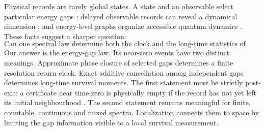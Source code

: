 \documentclass[10pt]{article}
\theoremstyle{definition}
\begin{document}
Physical records are rarely global states. A state and an observable select
particular energy gaps \cite{GarciaPintosEtAl2017}; delayed observable
records can reveal a dynamical dimension \cite{WolfPerezGarcia2009}; and
energy-level graphs organize accessible quantum dynamics
\cite{Altafini2002}. These facts suggest a sharper question:
\begin{equation}
 \boxed{\text{Can one spectral law determine both the clock and the
 long-time statistics of quantum return?}}
 \label{eq:question}
\end{equation}
Our answer is the energy-gap law. Its near-zero events have two distinct
meanings. Approximate phase closure of selected gaps determines a finite
resolution return clock. Exact additive cancellation among independent
gaps determines long-time survival moments. The first statement must be
strictly post-exit: a certificate near time zero is physically empty if the
record has not yet left its initial neighbourhood
\cite{KotowskiOszmaniec2026}. The second statement remains meaningful for
finite, countable, continuous and mixed spectra. Localization connects them
to space by limiting the gap information visible to a local survival
measurement.
\end{document}
